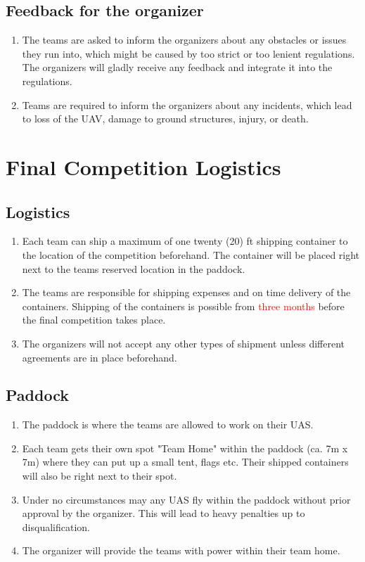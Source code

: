     \subsection{Feedback for the organizer}
    \begin{enumerate}
      \item The teams are asked to inform the organizers about any obstacles or issues they run into, which might be caused by
      too strict or too lenient regulations. The organizers will gladly receive any feedback and integrate it into the regulations. 
      \item Teams are required to inform the organizers about any incidents, which lead to loss of the UAV, damage to ground structures, injury, or death. 
    \end{enumerate}



    \section{Final Competition Logistics}
    \subsection{Logistics}
    \begin{enumerate}
      \item Each team can ship a maximum of one twenty (20) ft shipping container to the location of the competition beforehand. The container will be placed right next to the teams reserved location in the paddock.
      \item The teams are responsible for shipping expenses and on time delivery of the containers. Shipping of the containers is possible from \textcolor{red}{three months }before the final competition takes place.
      \item The organizers will not accept any other types of shipment unless different agreements are in place beforehand.
    \end{enumerate}

    \subsection{Paddock}
    \begin{enumerate}
      \item The paddock is where the teams are allowed to work on their UAS. 
      \item Each team gets their own spot "Team Home" within the paddock (ca. 7m x 7m) where they can put up a small tent, flags etc. Their shipped containers will also be right next to their spot. 
      \item Under no circumstances may any UAS fly within the paddock without prior approval by the organizer. This will lead to heavy penalties up to disqualification. 
      \item The organizer will provide the teams with power within their team home.    
    \end{enumerate}


